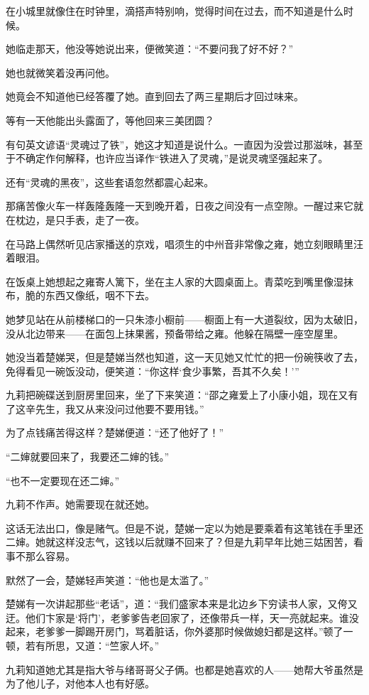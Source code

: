 \par 在小城里就像住在时钟里，滴搭声特别响，觉得时间在过去，而不知道是什么时候。
\par 她临走那天，他没等她说出来，便微笑道：“不要问我了好不好？”
\par 她也就微笑着没再问他。
\par 她竟会不知道他已经答覆了她。直到回去了两三星期后才回过味来。
\par 等有一天他能出头露面了，等他回来三美团圆？
\par 有句英文谚语“灵魂过了铁”，她这才知道是说什么。一直因为没尝过那滋味，甚至于不确定作何解释，也许应当译作“铁进入了灵魂，”是说灵魂坚强起来了。
\par 还有“灵魂的黑夜”，这些套语忽然都震心起来。
\par 那痛苦像火车一样轰隆轰隆一天到晚开着，日夜之间没有一点空隙。一醒过来它就在枕边，是只手表，走了一夜。
\par 在马路上偶然听见店家播送的京戏，唱须生的中州音非常像之雍，她立刻眼睛里汪着眼泪。
\par 在饭桌上她想起之雍寄人篱下，坐在主人家的大圆桌面上。青菜吃到嘴里像湿抹布，脆的东西又像纸，咽不下去。
\par 她梦见站在从前楼梯口的一只朱漆小橱前——橱面上有一大道裂纹，因为太破旧，没从北边带来——在面包上抹果酱，预备带给之雍。他躲在隔壁一座空屋里。
\par 她没当着楚娣哭，但是楚娣当然也知道，这一天见她又忙忙的把一份碗筷收了去，免得看见一碗饭没动，便笑道：“你这样‘食少事繁，吾其不久矣！'”
\par 九莉把碗碟送到厨房里回来，坐了下来笑道：“邵之雍爱上了小康小姐，现在又有了这辛先生，我又从来没问过他要不要用钱。”
\par 为了点钱痛苦得这样？楚娣便道：“还了他好了！”
\par “二婶就要回来了，我要还二婶的钱。”
\par “也不一定要现在还二婶。”
\par 九莉不作声。她需要现在就还她。
\par 这话无法出口，像是赌气。但是不说，楚娣一定以为她是要乘着有这笔钱在手里还二婶。她就这样没志气，这钱以后就赚不回来了？但是九莉早年比她三姑困苦，看事不那么容易。
\par 默然了一会，楚娣轻声笑道：“他也是太滥了。”
\par 楚娣有一次讲起那些“老话”，道：“我们盛家本来是北边乡下穷读书人家，又侉又迂。他们卞家是‘将门’，老爹爹告老回家了，还像带兵一样，天一亮就起来。谁没起来，老爹爹一脚踢开房门，骂着脏话，你外婆那时候做媳妇都是这样。”顿了一顿，若有所思，又道：“竺家人坏。”
\par 九莉知道她尤其是指大爷与绪哥哥父子俩。也都是她喜欢的人——她帮大爷虽然是为了他儿子，对他本人也有好感。
